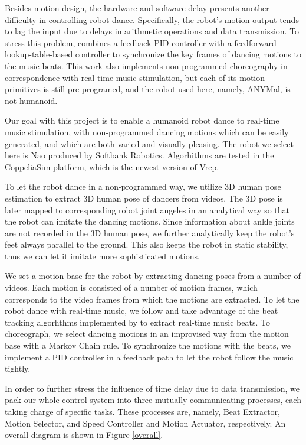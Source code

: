 \documentclass[UTF8,a4paper]{article}
\begin{document}
	Besides motion design, the hardware and software delay presents another difficulty in controlling robot dance. Specifically, the robot's motion output tends to lag the input due to delays in arithmetic operations and data transmission. To stress this problem, \cite{bi2018real} combines a feedback PID controller with a feedforward lookup-table-based controller to synchronize the key frames of dancing motions to the music beats. This work also implements non-programmed choreography in correspondence with real-time music stimulation, but each of its motion primitives is still pre-programed, and the robot used here, namely, ANYMal\cite{hutter2016anymal}, is not humanoid.

	Our goal with this project is to enable a humanoid robot dance to real-time music stimulation, with non-programmed dancing motions which can be easily generated, and which are both varied and visually pleasing. The robot we select here is Nao produced by Softbank Robotics. Algorhithms are tested in the CoppeliaSim\cite{rohmercoppeliasim} platform, which is the newest version of Vrep\cite{rohmer2013v}. 
	
	To let the robot dance in a non-programmed way, we utilize 3D human pose estimation to extract 3D human pose of dancers from videos. The 3D pose is later mapped to corresponding robot joint angeles in an analytical way so that the robot can imitate the dancing motions. Since information about ankle joints are not recorded in the 3D human pose, we further analytically keep the robot's feet always parallel to the ground. This also keeps the robot in static stability, thus we can let it imitate more sophisticated motions.

	We set a motion base for the robot by extracting dancing poses from a number of videos. Each motion is consisted of a number of motion frames, which corresponds to the video frames from which the motions are extracted. To let the robot dance with real-time music, we follow \cite{bi2018real} and take advantage of the beat tracking algorhthms implemented by \cite{bock2014multi} to extract real-time music beats. To choreograph, we select dancing motions in an improvised way from the motion base with a Markov Chain rule. To synchronize the motions with the beats, we implement a PID controller in a feedback path to let the robot follow the music tightly. 

	In order to further stress the influence of time delay due to data transmission, we pack our whole control system into three mutually communicating processes, each taking charge of specific tasks. These processes are, namely, Beat Extractor, Motion Selector, and Speed Controller and Motion Actuator, respectively. An overall diagram is shown in Figure \ref{overall}.
\end{document}
